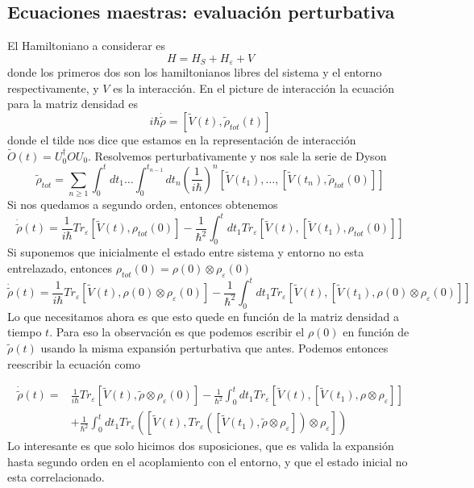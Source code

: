 \subsection{Ecuaciones maestras: evaluación perturbativa}
El Hamiltoniano a considerar es
$$H=H_S+H_\varepsilon+V$$
donde los primeros dos son los hamiltonianos libres del sistema y el entorno respectivamente, y $V$ es la interacción.
En el picture de interacción la ecuación para la matriz densidad es
$$i \hbar \dot{\tilde\rho} = [\tilde V(t),\tilde\rho_{tot}(t)] $$
donde el tilde nos dice que estamos en la representación de interacción $\tilde O(t) =U_0^\dagger O U_0 $. Resolvemos perturbativamente y nos sale la serie de Dyson
\begin{equation}
    \tilde\rho_{tot}=\sum_{n\geq1}\int_0^tdt_1\dots\int_0^{t_{n-1}}dt_n(\frac{1}{i\hbar})^n[\tilde V(t_1),\dots,[\tilde V(t_n),\tilde\rho_{tot}(0)]]
\end{equation}
Si nos quedamos a segundo orden, entonces obtenemos
\begin{equation}
    \dot{\tilde\rho}(t)=\frac{1}{i\hbar}Tr_\varepsilon[\tilde V(t),\rho_{tot}(0)]-\frac{1}{\hbar^2}\int_0^tdt_1Tr_\varepsilon[\tilde V(t),[\tilde V(t_1),\rho_{tot}(0)]]
\end{equation}
Si suponemos que inicialmente el estado entre sistema y entorno no esta entrelazado, entonces $\rho_{tot}(0)=\rho(0)\otimes\rho_\varepsilon(0)$
\begin{equation}
      \dot{\tilde\rho}(t)=\frac{1}{i\hbar}Tr_\varepsilon[\tilde V(t),\rho(0)\otimes\rho_\varepsilon(0)]-\frac{1}{\hbar^2}\int_0^tdt_1Tr_\varepsilon[\tilde V(t),[\tilde V(t_1),\rho(0)\otimes\rho_\varepsilon(0)]]
\end{equation}
Lo que necesitamos ahora es que esto quede en función de la matriz densidad a tiempo $t$. Para eso la observación es que podemos escribir el $\rho(0)$ en función de $\tilde\rho(t)$ usando la misma expansión perturbativa que antes. Podemos entonces reescribir la ecuación como 

\begin{equation}
    \begin{split}
        \dot{\tilde\rho}(t)=&\frac{1}{i\hbar}Tr_\varepsilon[\tilde V(t),\tilde\rho\otimes\rho_\varepsilon(0)]-\frac{1}{\hbar^2}\int_0^tdt_1Tr_\varepsilon[\tilde V(t),[\tilde V(t_1),\rho\otimes\rho_\varepsilon]] \\ &+\frac{1}{\hbar^2}\int_0^tdt_1Tr_\varepsilon\left([\tilde V(t),Tr_\varepsilon([\tilde V(t_1),\tilde\rho\otimes\rho_\varepsilon])\otimes\rho_\varepsilon]\right)
    \end{split}
\end{equation}
Lo interesante es que solo hicimos dos suposiciones, que es valida la expansión hasta segundo orden en el acoplamiento con el entorno, y que el estado inicial no esta correlacionado.
